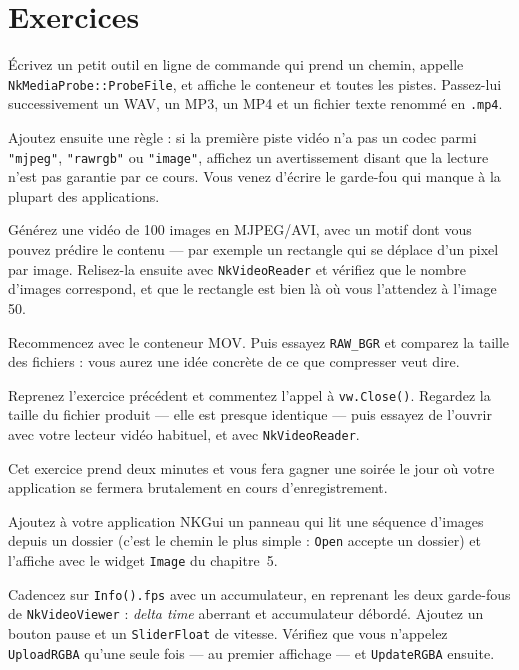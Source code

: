 \section{Exercices}

\begin{nkdemo}
Écrivez un petit outil en ligne de commande qui prend un chemin, appelle
\texttt{NkMediaProbe::ProbeFile}, et affiche le conteneur et toutes les pistes.
Passez-lui successivement un WAV, un MP3, un MP4 et un fichier texte renommé en
\texttt{.mp4}.

Ajoutez ensuite une règle : si la première piste vidéo n'a pas un codec parmi
\texttt{"mjpeg"}, \texttt{"rawrgb"} ou \texttt{"image"}, affichez un
avertissement disant que la lecture n'est pas garantie par ce cours. Vous venez
d'écrire le garde-fou qui manque à la plupart des applications.
\end{nkdemo}

\begin{nkdemo}
Générez une vidéo de 100 images en MJPEG/AVI, avec un motif dont vous pouvez
prédire le contenu — par exemple un rectangle qui se déplace d'un pixel par
image. Relisez-la ensuite avec \texttt{NkVideoReader} et vérifiez que le nombre
d'images correspond, et que le rectangle est bien là où vous l'attendez à
l'image 50.

Recommencez avec le conteneur MOV. Puis essayez \texttt{RAW\_BGR} et comparez la
taille des fichiers : vous aurez une idée concrète de ce que compresser veut
dire.
\end{nkdemo}

\begin{nkdemo}
Reprenez l'exercice précédent et commentez l'appel à \texttt{vw.Close()}.
Regardez la taille du fichier produit — elle est presque identique — puis
essayez de l'ouvrir avec votre lecteur vidéo habituel, et avec
\texttt{NkVideoReader}.

Cet exercice prend deux minutes et vous fera gagner une soirée le jour où votre
application se fermera brutalement en cours d'enregistrement.
\end{nkdemo}

\begin{nkpratique}
Ajoutez à votre application NKGui un panneau qui lit une séquence d'images
depuis un dossier (c'est le chemin le plus simple : \texttt{Open} accepte un
dossier) et l'affiche avec le widget \texttt{Image} du chapitre~5.

Cadencez sur \texttt{Info().fps} avec un accumulateur, en reprenant les deux
garde-fous de \texttt{NkVideoViewer} : \emph{delta time} aberrant et
accumulateur débordé. Ajoutez un bouton pause et un \texttt{SliderFloat} de
vitesse. Vérifiez que vous n'appelez \texttt{UploadRGBA} qu'une seule fois — au
premier affichage — et \texttt{UpdateRGBA} ensuite.
\end{nkpratique}

